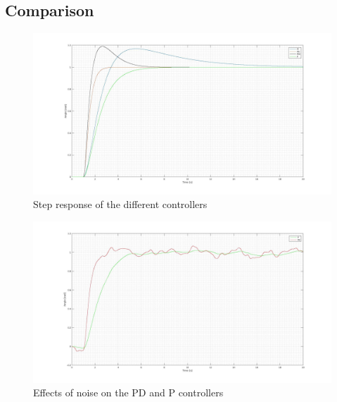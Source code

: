 \subsection{Comparison}

\begin{figure}[H]
\centering
\includegraphics[scale=0.2]{figures/comp_full.jpg}
\caption{Step response of the different controllers}
\label{dcmotor_circuit}
\end{figure}

\begin{figure}[H]
\centering
\includegraphics[scale=0.2]{figures/comp_PDP.jpg}
\caption{Effects of noise on the PD and P controllers}
\label{dcmotor_circuit}
\end{figure}


